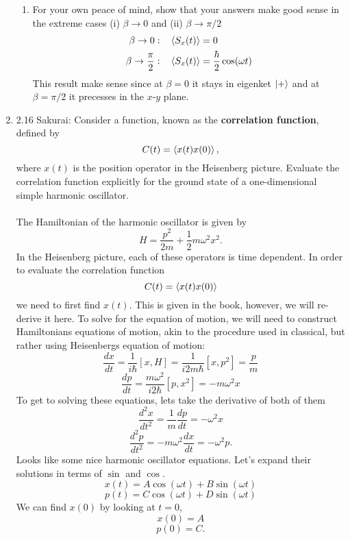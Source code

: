 \documentclass[11pt,letterpaper]{article}
\begin{document}
\begin{enumerate}
\begin{enumerate}
\item For your own peace of mind, show that your answers make good sense in the extreme cases (i) $\beta\to0$ and (ii) $\beta\to\pi/2$
\\ \begin{align*}\beta\to0:&\quad \braket{S_x(t)}=0\\
\beta\to\frac{\pi}{2}:&\quad\braket{S_x(t)} = \frac{\hbar}{2}\cos(\omega t)\end{align*}
This result make sense since at $\beta = 0$ it stays in eigenket $\ket{+}$ and at $\beta = \pi/2$ it precesses in the $x$-$y$ plane. 
\end{enumerate}
\item 2.16 Sakurai: Consider a function, known as the \textbf{correlation function}, defined by
$$C(t) = \braket{x(t)x(0)},$$
where $x(t)$ is the position operator in the Heisenberg picture. Evaluate the correlation function explicitly for the ground state of a one-dimensional simple harmonic oscillator. 
\\ \\The Hamiltonian of the harmonic oscillator is given by
$$H = \frac{p^2}{2m}+\frac{1}{2}m\omega^2x^2.$$
In the Heisenberg picture, each of these operators is time dependent. In order to evaluate the correlation function
\begin{equation}\label{14}
C(t) = \braket{x(t)x(0)}
\end{equation}
we need to first find $x(t)$. This is given in the book, however, we will re-derive it here.
To solve for the equation of motion, we will need to construct Hamiltonians equations of motion, akin to the procedure used in classical, but rather using Heisenbergs equation of motion:
$$\frac{dx}{dt} = \frac{1}{i\hbar}[x,H] = \frac{1}{i2m\hbar}[x,p^2] = \frac{p}{m}$$
$$\frac{dp}{dt} = \frac{m\omega^2}{i2\hbar}[p,x^2] = -m\omega^2x$$
To get to solving these equations, lets take the derivative of both of them
$$\frac{d^2x}{dt^2} = \frac{1}{m}\frac{dp}{dt} = -\omega^2 x$$
$$\frac{d^2p}{dt^2} = -m\omega^2\frac{dx}{dt} = -\omega^2 p.$$
Looks like some nice harmonic oscillator equations. Let's expand their solutions in terms of $\sin$ and $\cos$.
\begin{equation}\label{15}x(t) = A\cos(\omega t)+B\sin(\omega t)\end{equation}
\begin{equation}\label{16}p(t) = C\cos(\omega t)+D\sin(\omega t)\end{equation}
We can find $x(0)$ by looking at $t=0$,
$$x(0) = A$$
$$p(0) = C.$$

\end{enumerate}
\end{document}

